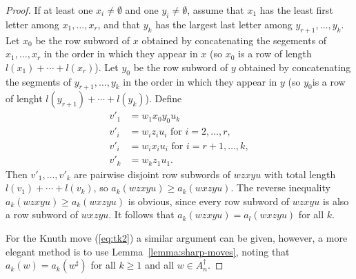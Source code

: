 \documentclass[10pt]{amsproc}
\theoremstyle{definition}
\theoremstyle{remark}
\begin{document}
\begin{proof}
  If at least one $x_i\neq \emptyset$ and one $y_i\neq\emptyset$, assume that $x_1$ has the least first letter among $x_1,\dotsc,x_r$, and that $y_k$ has the largest last letter among $y_{r+1},\dotsc,y_k$.
  Let $x_0$ be the row subword of $x$ obtained by concatenating the segements of $x_1,\dotsc,x_r$ in the order in which they appear in $x$ (so $x_0$ is a row of length $l(x_1)+\dotsb + l(x_r)$).
  Let $y_0$ be the row subword of $y$ obtained by concatenating the segments of $y_{r+1},\dotsc, y_k$ in the order in which they appear in $y$ (so $y_0$is a row of lenght $l(y_{r+1})+\dotsb + l(y_k)$).
  Define
  \begin{align*}
    v'_1 &= w_1x_0y_0u_k\\
    v'_i &= w_iz_iu_i \text{ for }i=2,\dotsc,r,\\
    v'_i &= w_ix_iu_i \text{ for } i=r+1,\dotsc,k,\\
    v'_k &= w_kz_1u_1.
  \end{align*}
  Then $v'_1,\dotsc,v'_k$ are pairwise disjoint row subwords of $wzxyu$ with total length $l(v_1)+\dotsb+l(v_k)$, so $a_k(wzxyu)\geq a_k(wxzyu)$.
  The reverse inequality $a_k(wzxyu)\geq a_k(wxzyu)$ is obvious, since every row subword of $wzxyu$ is also a row subword of $wxzyu$.
  It follows that $a_k(wzxyu)=a_l(wxzyu)$ for all $k$.

  For the Knuth move (\ref{eq:tk2}) a similar argument can be given, however, a more elegant method is to use Lemma~\ref{lemma:sharp-moves}, noting that $a_k(w)=a_k(w^\sharp)$ for all $k\geq 1$ and all $w\in A_n^\dagger$.
\end{proof}
\end{document}
